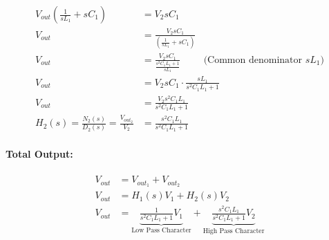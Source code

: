 \begin{enumerate}
\begin{align*}
      V_{out}(\frac{1}{sL_1} + sC_1) &= V_{2}sC_1 \\
      V_{out} &= \frac{V_{2}sC_1}{(\frac{1}{sL_1} + sC_1)} \\
      V_{out} &= \frac{V_{2}sC_1}{\frac{s^2C_1L_1 + 1}{sL_1}} \hspace{1cm} \text{(Common denominator \(sL_1\))} \\
      V_{out} &= V_{2}sC_1 \cdot \frac{sL_1}{s^2C_1L_1 + 1} \\
      V_{out} &= \frac{V_{2}s^2C_1L_1}{s^2C_1L_1 + 1} \\
      H_2(s) = \frac{N_2(s)}{D_2(s)} = \frac{V_{out_2}}{V_{2}} &= \frac{s^2C_1L_1}{s^2C_1L_1 + 1}
    \end{align*}
\end{enumerate}
\paragraph{Total Output:}
\begin{align*}
  V_{out} &= V_{out_1} + V_{out_2} \\
  V_{out} &= H_1(s)V_{1} + H_2(s)V_{2} \\
  V_{out} &= \underbrace{\frac{1}{s^2C_1L_1 + 1}V_{1}}_{\text{Low Pass Character}} + \underbrace{\frac{s^2C_1L_1}{s^2C_1L_1 + 1}V_{2}}_{\text{High Pass Character}}
\end{align*}

